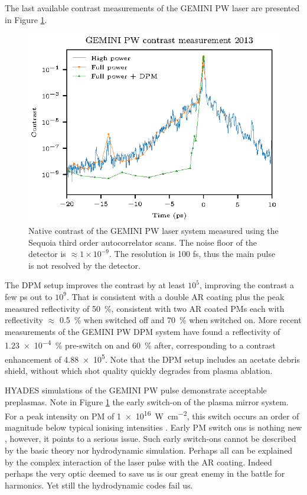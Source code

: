 The last available contrast measurements of the GEMINI PW laser are presented in Figure \ref{fig:geminicontrast}. 
\begin{figure}
	\centering
	\includegraphics{figures/gemini/gemini_contrast}
	\caption[Native contrast of the GEMINI PW laser system.]{Native contrast of the GEMINI PW laser system measured using the Sequoia third order autocorrelator scans. The noise floor of the detector is $\approx 1\times 10^{-9}$. The resolution is 100 fs, thus the main pulse is not resolved by the detector.}
	\label{fig:geminicontrast}
\end{figure}
The \ac{DPM} setup improves the contrast by at least $10^5$, improving the contrast a few ps out to $10^9$. That is consistent with a double AR coating plus the peak measured reflectivity of \qty{50}{\%}, consistent with two AR coated PMs each with reflectivity $\approx$ \qty{0.5}{\%} when switched off and \qty{70}{\%} when switched on. More recent measurements of the GEMINI PW DPM system have found a reflectivity of \qty{1.23e-4}{\%} pre-switch on and \qty{60}{\%} after, corresponding to a contrast enhancement of \num{4.88e5}. Note that the DPM setup includes an acetate debris shield, without which shot quality quickly degrades from plasma ablation.

HYADES simulations of the GEMINI PW pulse demonstrate acceptable preplasmas. 
Note in Figure \ref{fig:geminicontrast} the early switch-on of the plasma mirror system. For a peak intensity on \ac{PM} of \qty{1e16}{W.cm^{-2}}, this switch occurs an order of magnitude below typical ionising intensities \cite{umstadterRelativisticLaserPlasma2003}. Early PM switch ons is nothing new \cite{caiTimeresolvedMeasurementsReflectivity2009}, however, it points to a serious issue. Such early switch-ons cannot be described by the basic theory nor hydrodynamic simulation. Perhaps all can be explained by the complex interaction of the laser pulse with the AR coating. Indeed perhaps the very optic deemed to save us is our great enemy in the battle for harmonics. Yet still the hydrodynamic codes fail us. 

